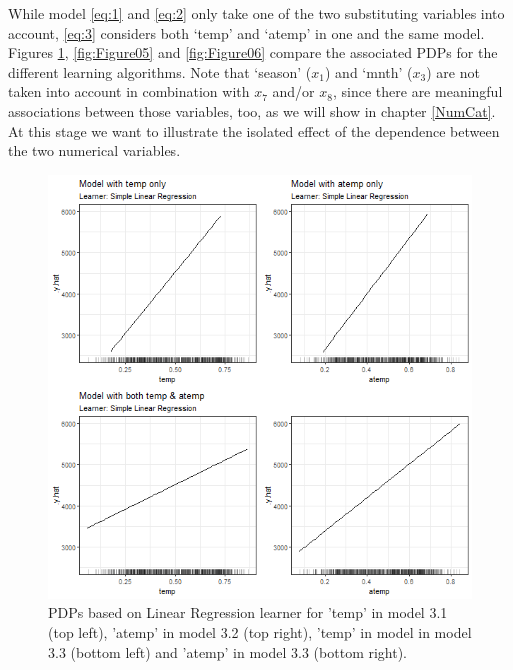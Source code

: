 \documentclass[]{krantz}
\begin{document}
While model \eqref{eq:1} and \eqref{eq:2} only take one of the two
substituting variables into account, \eqref{eq:3} considers both `temp'
and `atemp' in one and the same model. Figures \ref{fig:Figure04},
\ref{fig:Figure05} and \ref{fig:Figure06} compare the associated PDPs
for the different learning algorithms. Note that `season' (\(x_1\)) and
`mnth' (\(x_3\)) are not taken into account in combination with \(x_7\)
and/or \(x_8\), since there are meaningful associations between those
variables, too, as we will show in chapter \ref{NumCat}. At this stage
we want to illustrate the isolated effect of the dependence between the
two numerical variables.

\begin{figure}

{\centering \includegraphics[width=0.8\linewidth]{images/VK_PDP_4_Correlated_numerical_LM} 

}

\caption{PDPs based on Linear Regression learner for 'temp' in model 3.1 (top left), 'atemp' in model 3.2 (top right), 'temp' in model in model 3.3 (bottom left) and 'atemp' in model 3.3 (bottom right).}\label{fig:Figure04}
\end{figure}
\end{document}
